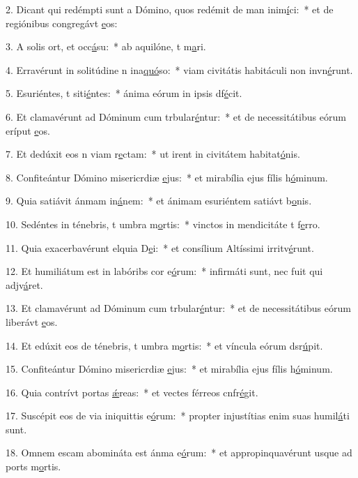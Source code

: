 2. Dicant qui redémpti sunt a Dómino, quos redémit de man inim\uline{í}ci:~* et de regiónibus congregávt \uline{e}os:\par 
3. A solis ort, et occ\uline{á}su:~* ab aquilóne, t m\uline{a}ri.\par 
4. Erravérunt in solitúdine n ina\uline{quó}so:~* viam civitátis habitáculi non invn\uline{é}runt.\par 
5. Esuriéntes, t siti\uline{é}ntes:~* ánima eórum in ipsis df\uline{é}cit.\par 
6. Et clamavérunt ad Dóminum cum trbular\uline{é}ntur:~* et de necessitátibus eórum eríput \uline{e}os.\par 
7. Et dedúxit eos n viam r\uline{e}ctam:~* ut irent in civitátem habitat\uline{ó}nis.\par 
8. Confiteántur Dómino misericrdiæ \uline{e}jus:~* et mirabília ejus fílis h\uline{ó}minum.\par 
9. Quia satiávit ánmam in\uline{á}nem:~* et ánimam esuriéntem satiávt b\uline{o}nis.\par 
10. Sedéntes in ténebris, t umbra m\uline{o}rtis:~* vinctos in mendicitáte t f\uline{e}rro.\par 
11. Quia exacerbavérunt elquia D\uline{e}i:~* et consílium Altíssimi irritv\uline{é}runt.\par 
12. Et humiliátum est in labóribs cor e\uline{ó}rum:~* infirmáti sunt, nec fuit qui adjv\uline{á}ret.\par 
13. Et clamavérunt ad Dóminum cum trbular\uline{é}ntur:~* et de necessitátibus eórum liberávt \uline{e}os.\par 
14. Et edúxit eos de ténebris, t umbra m\uline{o}rtis:~* et víncula eórum dsr\uline{ú}pit.\par 
15. Confiteántur Dómino misericrdiæ \uline{e}jus:~* et mirabília ejus fílis h\uline{ó}minum.\par 
16. Quia contrívt portas \uline{ǽ}reas:~* et vectes férreos cnfr\uline{é}git.\par 
17. Suscépit eos de via iniquittis e\uline{ó}rum:~* propter injustítias enim suas humil\uline{á}ti sunt.\par 
18. Omnem escam abomináta est ánma e\uline{ó}rum:~* et appropinquavérunt usque ad ports m\uline{o}rtis.\par 
